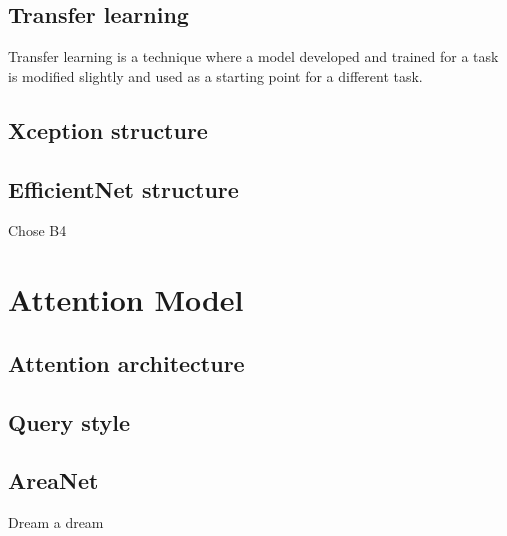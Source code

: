 \subsection{Transfer learning}

Transfer learning is a technique where a model developed and trained for a task is modified slightly and used as a starting point for a different task.

\subsection{Xception structure}

\subsection{EfficientNet structure}

Chose B4

\section{Attention Model}
\label{sec:attention_model}

\subsection{Attention architecture}

\subsection{Query style}

\subsection{AreaNet}

Dream a dream

